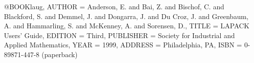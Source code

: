 @BOOK{laug,
      AUTHOR = {Anderson, E. and Bai, Z. and Bischof, C. and
                Blackford, S. and Demmel, J. and Dongarra, J. and
                Du Croz, J. and Greenbaum, A. and Hammarling, S. and
                McKenney, A. and Sorensen, D.},
      TITLE = {{LAPACK} Users' Guide},
      EDITION = {Third},
      PUBLISHER = {Society for Industrial and Applied Mathematics},
      YEAR = {1999},
      ADDRESS = {Philadelphia, PA},
      ISBN = {0-89871-447-8 (paperback)} }
      